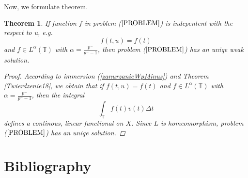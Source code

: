 \documentclass[12pt,a4paper,oneside,titlepage]{article}
\newtheorem{Twierdzenie}{Theorem}
\begin{document}
\indent
Now, we formulate theorem.
\begin{Twierdzenie} If function $f$ in problem ($\ref{PROBLEM}$) is indepentent with the respect to u, e.g.
\begin{equation}
\nonumber
f(t,u)=f(t)
\end{equation}
and $f \in L^{\alpha}(\mathbb{T})$ with $\alpha=\frac{p^-}{p^- -1}$,  then problem ($\ref{PROBLEM}$) has an uniqe weak solution.
\begin{proof}
According to immersion (\ref{zanurzanieWpMinus}) and Theorem \ref{Twierdzenie18}, we obtain that if  $f(t,u)=f(t)$ and $f \in L^{\alpha}(\mathbb{T})$ with $\alpha=\frac{p^-}{p^- -1}$,  then the integral
\begin{equation}
\nonumber
\int_{\mathbb{T}} f(t) v(t) \Delta t
\end{equation}
defines a continous, linear functional on $X$. Since $L$ is homeomorphism, problem ($\ref{PROBLEM}$) has an uniqe solution.
\end{proof}
\end{Twierdzenie}
\newpage


\section{Bibliography}
\end{document}
